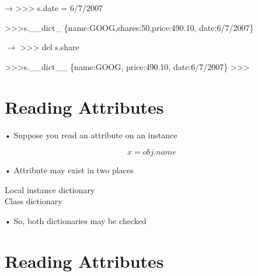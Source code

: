 \documentclass[
  letterpaper,
  DIV=11,
  numbers=noendperiod]{scrreprt}
\newenvironment{Shaded}{\begin{snugshade}}{\end{snugshade}}
\newcommand{\NormalTok}[1]{\textcolor[rgb]{0.00,0.23,0.31}{#1}}
\begin{document}
\begin{Shaded}
\begin{Highlighting}[]
\NormalTok{→ \textgreater{}\textgreater{}\textgreater{} s.date = \textquotesingle{}6/7/2007\textquotesingle{} }
\end{Highlighting}
\end{Shaded}

\begin{Shaded}
\begin{Highlighting}[]
\NormalTok{\textgreater{}\textgreater{}\textgreater{}s.\_\_dict\_}
\NormalTok{\{\textquotesingle{}name\textquotesingle{}:\textquotesingle{}GOOG\textquotesingle{},\textquotesingle{}shares\textquotesingle{}:50,\textquotesingle{}price\textquotesingle{}:490.10, \textquotesingle{}date\textquotesingle{}:\textquotesingle{}6/7/2007\textquotesingle{}\} }
\end{Highlighting}
\end{Shaded}

\(\longrightarrow\) \textgreater\textgreater\textgreater{} del s.share

\begin{Shaded}
\begin{Highlighting}[]
\NormalTok{\textgreater{}\textgreater{}\textgreater{}s.\_\_dict\_\_}
\NormalTok{\{\textquotesingle{}name\textquotesingle{}:\textquotesingle{}GOOG\textquotesingle{}, \textquotesingle{}price\textquotesingle{}:490.10, \textquotesingle{}date\textquotesingle{}:\textquotesingle{}6/7/2007\textquotesingle{}\}  }
\NormalTok{\textgreater{}\textgreater{}\textgreater{} }
\end{Highlighting}
\end{Shaded}


\chapter{Reading Attributes}\label{reading-attributes}

• Suppose you read an attribute on an instance

\[
x = o b j. n a m e
\]

• Attribute may exist in two places

Local instance dictionary\\
Class dictionary

• So, both dictionaries may be checked


\chapter{Reading Attributes}\label{reading-attributes-1}
\end{document}
